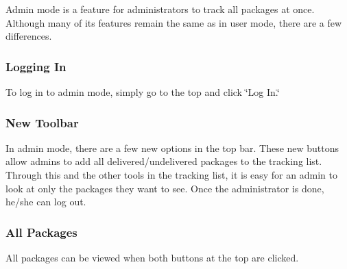 Admin mode is a feature for administrators to track all packages at once. Although many of its features remain the same as in user mode, there are a few differences. ​ \subsubsection*{Logging In}

To log in to admin mode, simply go to the top and click \char`\"{}\+Log In.\char`\"{}  \subsubsection*{New Toolbar}

In admin mode, there are a few new options in the top bar.  These new buttons allow admins to add all delivered/undelivered packages to the tracking list. Through this and the other tools in the tracking list, it is easy for an admin to look at only the packages they want to see. Once the administrator is done, he/she can log out. ​ \subsubsection*{All Packages}

All packages can be viewed when both buttons at the top are clicked.  